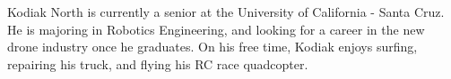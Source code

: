 \documentclass[12pt,journal,compsoc]{IEEEtran}
\begin{document}

\begin{IEEEbiographynophoto}{Kodiak North}
is currently a senior at the University of California - Santa Cruz. He is majoring in Robotics Engineering, and looking for a career in the new drone industry once he graduates. On his free time, Kodiak enjoys surfing, repairing his truck, and flying his RC race quadcopter.
\end{IEEEbiographynophoto}





\end{document}
